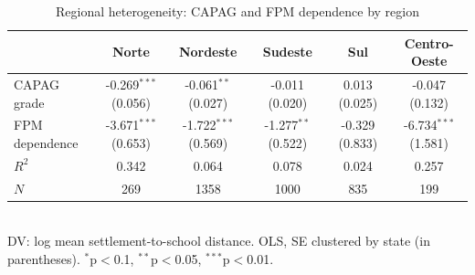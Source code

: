 \begin{table}[h]
\centering
\caption{Regional heterogeneity: CAPAG and FPM dependence by region}
\begin{tabular}{lccccc}
\toprule
& Norte & Nordeste & Sudeste & Sul & Centro-Oeste \\
\midrule
CAPAG grade & -0.269$^{***}$ (0.056) & -0.061$^{**}$ (0.027) & -0.011 (0.020) & 0.013 (0.025) & -0.047 (0.132) \\
FPM dependence & -3.671$^{***}$ (0.653) & -1.722$^{***}$ (0.569) & -1.277$^{**}$ (0.522) & -0.329 (0.833) & -6.734$^{***}$ (1.581) \\
\midrule
$R^2$ & 0.342 & 0.064 & 0.078 & 0.024 & 0.257 \\
$N$ & 269 & 1358 & 1000 & 835 & 199 \\
\bottomrule
\end{tabular}
\\[4pt]
\footnotesize{DV: log mean settlement-to-school distance. OLS, SE clustered by state (in parentheses). $^{*}$p$<$0.1, $^{**}$p$<$0.05, $^{***}$p$<$0.01.}
\end{table}
